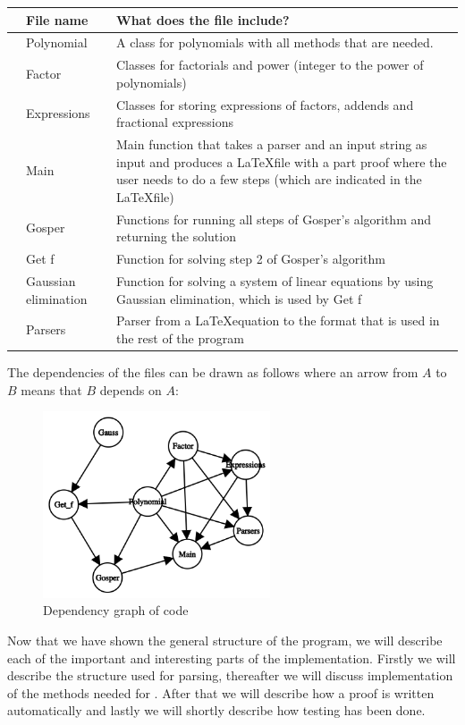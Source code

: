 \begin{center}
  \begin{tabular}{C{1mm}C{3cm}|C{8cm}}
    &\textbf{File name}   & \textbf{What does the file include?} \\ \hline
    &Polynomial  & A class for polynomials with all methods that are needed. \\ \hline
    &Factor      & Classes for factorials and power (integer to the power of polynomials) \\ \hline
    &Expressions & Classes for storing expressions of factors, addends and fractional expressions \\ \hline
    &Main        & Main function that takes a parser and an input string as input and produces a \LaTeX file with a part proof where the user needs to do a few steps (which are indicated in the \LaTeX file) \\ \hline
    &Gosper      & Functions for running all steps of Gosper's algorithm and returning the solution \\ \hline
    &Get f       & Function for solving step 2 of Gosper's algorithm \\ \hline
    &Gaussian elimination & Function for solving a system of linear equations by using Gaussian elimination, which is used by Get f \\ \hline
    &Parsers     & Parser from a \LaTeX equation to the format that is used in the rest of the program \\
  \end{tabular}
\end{center}

The dependencies of the files can be drawn as follows where an arrow from $A$ to $B$ means that $B$ depends on $A$:
\begin{figure}[H]
\centering
\includegraphics[width=0.6\textwidth]{images/dependency_graph.png}
\caption{Dependency graph of code}\label{Fig: DepGraph}
\end{figure}
Now that we have shown the general structure of the program, we will describe each of the important and interesting parts of the implementation. Firstly we will describe the structure used for parsing, thereafter we will discuss implementation of the methods needed for \WZ. After that we will describe how a proof is written automatically and lastly we will shortly describe how testing has been done.


